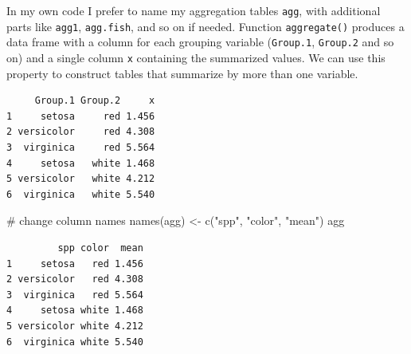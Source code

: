 \documentclass[
  13,
  letterpaper,
]{report}
\newenvironment{Shaded}{\begin{snugshade}}{\end{snugshade}}
\newcommand{\AttributeTok}[1]{\textcolor[rgb]{0.40,0.45,0.13}{#1}}
\newcommand{\CommentTok}[1]{\textcolor[rgb]{0.37,0.37,0.37}{#1}}
\newcommand{\FunctionTok}[1]{\textcolor[rgb]{0.28,0.35,0.67}{#1}}
\newcommand{\NormalTok}[1]{\textcolor[rgb]{0.00,0.23,0.31}{#1}}
\newcommand{\OtherTok}[1]{\textcolor[rgb]{0.00,0.23,0.31}{#1}}
\newcommand{\SpecialCharTok}[1]{\textcolor[rgb]{0.37,0.37,0.37}{#1}}
\newcommand{\StringTok}[1]{\textcolor[rgb]{0.13,0.47,0.30}{#1}}
\begin{document}
In my own code I prefer to name my aggregation tables \texttt{agg}, with
additional parts like \texttt{agg1}, \texttt{agg.fish}, and so on if
needed. Function \texttt{aggregate()} produces a data frame with a
column for each grouping variable (\texttt{Group.1}, \texttt{Group.2}
and so on) and a single column \texttt{x} containing the summarized
values. We can use this property to construct tables that summarize by
more than one variable.

\begin{Shaded}
\end{Shaded}

\begin{verbatim}
     Group.1 Group.2     x
1     setosa     red 1.456
2 versicolor     red 4.308
3  virginica     red 5.564
4     setosa   white 1.468
5 versicolor   white 4.212
6  virginica   white 5.540
\end{verbatim}

\begin{Shaded}
\begin{Highlighting}[]
\CommentTok{\# change column names}
\FunctionTok{names}\NormalTok{(agg) }\OtherTok{\textless{}{-}} \FunctionTok{c}\NormalTok{(}\StringTok{"spp"}\NormalTok{, }\StringTok{"color"}\NormalTok{, }\StringTok{"mean"}\NormalTok{)}
\NormalTok{agg}
\end{Highlighting}
\end{Shaded}

\begin{verbatim}
         spp color  mean
1     setosa   red 1.456
2 versicolor   red 4.308
3  virginica   red 5.564
4     setosa white 1.468
5 versicolor white 4.212
6  virginica white 5.540
\end{verbatim}
\end{document}
